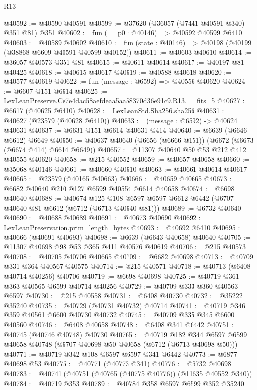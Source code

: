 \begin{lexlean}{R13}
\begin{coremodule}
@40592 := @40590 @40591
@40599 := @37620 (@36057 (@7441 @40591 @340) @351 @81) @351
@40602 := fun (__p0 : @40146) => @40592 @40599 @6410
@40603 := @40589 @40602
@40610 := fun (state : @40146) => @40198 (@40199 (@38868 @6609 @40591 @40599 @40152))
@40611 := @40603 @40610
@40614 := @36057 @40573 @351 @81
@40615 := @40611 @40614
@40617 := @40197 @81 @40425
@40618 := @40615 @40617
@40619 := @40588 @40618
@40620 := @40577 @40619
@40622 := fun (message : @6592) => @40556 @40620
@40624 := @6607 @151 @6614
@40625 := LexLeanPreserve.Ce7e4dac58aefdeaa5aa58370d36e91c9.R13.__fits_5
@40627 := @6617 (@40625 @6410)
@40628 := LexLeanStd.Sha256.sha256
@40631 := @40627 (@23579 (@40628 @6410))
@40633 := (message : @6592) -> @40624 @40631
@40637 := @6631 @151 @6614 @40631 @414
@40640 := @6639 (@6646 @6612) @6649
@40650 := @40637 @40640 (@6656 (@6666 @151)) (@6672 (@6673 (@6674 @414) @6614 @6649))
@40657 := @11307 @40640 @50 @53 @212 @412 @40555 @40620
@40658 := @215 @40552
@40659 := @40657 @40658
@40660 := @35068 @40146
@40661 := @40660 @40610
@40663 := @40661 @40614 @40617
@40665 := @23579 (@40165 @40663)
@40666 := @40659 @40665
@40673 := @6682 @40640 @210 @127 @6599 @40554 @6614 @40658
@40674 := @6698 @40640
@40688 := @40674
    @125
    @108
    @6597
    @6597
    @6612
    @6442
    (@6707 @40640 @81 @6612 (@6712 (@6713 @40640 @81)))
@40689 := @6732 @40640
@40690 := @40688 @40689
@40691 := @40673 @40690
@40692 := LexLeanPreservation.prim_length_bytes
@40693 := @40692 @6410
@40695 := @40666 (@40691 @40693)
@40698 := @6639 (@6643 @40658) @40640
@40705 := @11307 @40698 @98 @53 @365 @411 @40576 @40619
@40706 := @215 @40573
@40708 := @40705 @40706 @40665
@40709 := @6682 @40698
@40713 := @40709 @331 @364 @40567 @40575
@40714 := @215 @40571
@40718 := @40713 (@6408 @40714 @40256) @40706
@40719 := @6698 @40698
@40725 := @40719 @361 @363 @40565 @6599 @40714 @40256
@40729 := @40709 @333 @360 @40563 @6597
@40730 := @215 @40558
@40731 := @6408 @40730
@40732 := @35222 @35240
@40735 := @40729 (@40731 @40732) @40714
@40741 := @40719 @346 @359 @40561 @6600 @40730 @40732
@40745 := @40709 @335 @345 @6600 @40560
@40746 := @6408 @40658
@40748 := @6408 @341 @6442
@40751 := @40745 (@40746 @40748) @40730
@40765 := @40719
    @182
    @344
    @6597
    @6599
    @40658
    @40748
    (@6707 @40698 @50 @40658 (@6712 (@6713 @40698 @50)))
@40771 := @40719 @342 @108 @6597 @6597 @341 @6442
@40773 := @6877 @40698 @53
@40775 := @40771 (@40773 @341)
@40776 := @6732 @40698
@40783 := @40741 (@40751 (@40765 (@40775 @40776)) (@11635 @40552 @340))
@40784 := @40719 @353
@40789 := @40784 @358 @6597 @6599 @352 @35240

\end{coremodule}
\end{lexlean}
